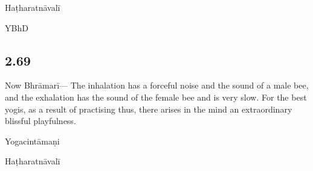 \begin{ekdosis}
\begin{testimonia}[hp02_068]
\begin{versinnote}
\end{versinnote}

Haṭharatnāvalī

\begin{versinnote}
\end{versinnote}

YBhD

\begin{versinnote}
\end{versinnote}
\end{testimonia}

\begin{philcomm}[hp02_068]
\end{philcomm}

\subsection*{2.69}
\begin{translation}[hp02_069]
Now Bhrāmarī---
The inhalation has a forceful noise and the sound of a male bee, and the exhalation has the sound of the female bee and is very slow. For the best yogis, as a result of practising thus, there arises in the mind an extraordinary blissful playfulness.
\end{translation}

\begin{testimonia}[hp02_069]
Yogacintāmaṇi

\begin{versinnote}
\end{versinnote}

Haṭharatnāvalī


\end{testimonia}
\end{ekdosis}
